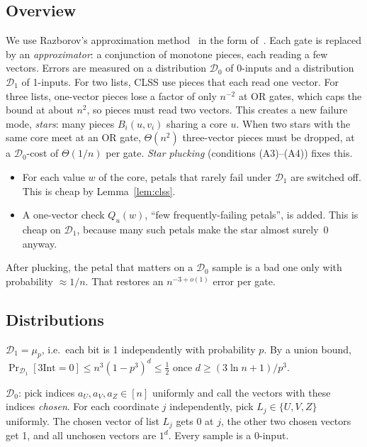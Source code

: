 \documentclass[11pt,a4paper]{article}
\theoremstyle{plain}
\theoremstyle{definition}
\theoremstyle{remark}
\newcommand{\tInt}{3\mathrm{Int}}
\newcommand{\Dz}{\mathcal{D}_0}
\newcommand{\Do}{\mathcal{D}_1}
\newcommand{\ones}{1^d}
\begin{document}
\subsection{Overview}
We use Razborov's approximation method~\cite{Raz85,AB87} in the form of~\cite{CLSS26}. Each gate is replaced by an
\emph{approximator}: a conjunction of monotone pieces, each reading a few vectors. Errors are measured on a
distribution $\Dz$ of 0-inputs and a distribution $\Do$ of 1-inputs. For two lists, CLSS use pieces that each read
one vector. For three lists, one-vector pieces lose a factor of only $n^{-2}$ at OR gates, which caps the bound at
about $n^2$, so pieces must read two vectors. This creates a new failure mode, \emph{stars}: many pieces $B_i(u,v_i)$
sharing a core $u$. When two stars with the same core meet at an OR gate, $\Theta(n^2)$ three-vector pieces must be
dropped, at a $\Dz$-cost of $\Theta(1/n)$ per gate. \emph{Star plucking} (conditions (A3)--(A4)) fixes this.
\begin{itemize}
  \item For each value $w$ of the core, petals that rarely fail under $\Do$ are switched off. This is cheap by
    Lemma~\ref{lem:clss}.
  \item A one-vector check $Q_u(w)$, ``few frequently-failing petals'', is added. This is cheap on $\Do$, because
    many such petals make the star almost surely~0 anyway.
\end{itemize}
After plucking, the petal that matters on a $\Dz$ sample is a bad one only with probability $\approx1/n$. That restores
an $n^{-3+o(1)}$ error per gate.

\subsection{Distributions}
$\Do=\mu_p$, i.e.\ each bit is 1 independently with probability $p$. By a union bound,
$\Pr_{\Do}[\tInt=0]\le n^3(1-p^3)^d\le\frac12$ once $d\ge(3\ln n+1)/p^3$.

$\Dz$: pick indices $a_U,a_V,a_Z\in[n]$ uniformly and call the vectors with these indices \emph{chosen}. For each
coordinate $j$ independently, pick $L_j\in\{U,V,Z\}$ uniformly. The chosen vector of list $L_j$ gets 0 at $j$, the
other two chosen vectors get 1, and
all unchosen vectors are $\ones$. Every sample is a 0-input.
\end{document}
